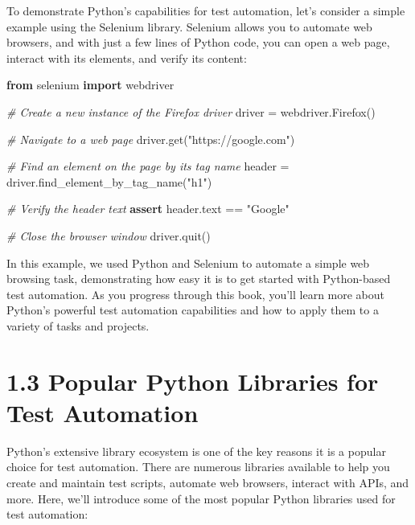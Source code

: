 \documentclass[
  paper=a4,
  ,captions=tableheading
]{scrartcl}
\newenvironment{Shaded}{}{}
\newcommand{\CommentTok}[1]{\textcolor[rgb]{0.38,0.63,0.69}{\textit{#1}}}
\newcommand{\ControlFlowTok}[1]{\textcolor[rgb]{0.00,0.44,0.13}{\textbf{#1}}}
\newcommand{\ImportTok}[1]{\textcolor[rgb]{0.00,0.50,0.00}{\textbf{#1}}}
\newcommand{\NormalTok}[1]{#1}
\newcommand{\OperatorTok}[1]{\textcolor[rgb]{0.40,0.40,0.40}{#1}}
\newcommand{\StringTok}[1]{\textcolor[rgb]{0.25,0.44,0.63}{#1}}
\begin{document}
To demonstrate Python's capabilities for test automation, let's consider
a simple example using the Selenium library. Selenium allows you to
automate web browsers, and with just a few lines of Python code, you can
open a web page, interact with its elements, and verify its content:

\begin{Shaded}
\begin{Highlighting}[]
\ImportTok{from}\NormalTok{ selenium }\ImportTok{import}\NormalTok{ webdriver}

\CommentTok{\# Create a new instance of the Firefox driver}
\NormalTok{driver }\OperatorTok{=}\NormalTok{ webdriver.Firefox()}

\CommentTok{\# Navigate to a web page}
\NormalTok{driver.get(}\StringTok{"https://google.com"}\NormalTok{)}

\CommentTok{\# Find an element on the page by its tag name}
\NormalTok{header }\OperatorTok{=}\NormalTok{ driver.find\_element\_by\_tag\_name(}\StringTok{"h1"}\NormalTok{)}

\CommentTok{\# Verify the header text}
\ControlFlowTok{assert}\NormalTok{ header.text }\OperatorTok{==} \StringTok{"Google"}

\CommentTok{\# Close the browser window}
\NormalTok{driver.quit()}
\end{Highlighting}
\end{Shaded}

In this example, we used Python and Selenium to automate a simple web
browsing task, demonstrating how easy it is to get started with
Python-based test automation. As you progress through this book, you'll
learn more about Python's powerful test automation capabilities and how
to apply them to a variety of tasks and projects.

\hypertarget{popular-python-libraries-for-test-automation}{%
\section{1.3 Popular Python Libraries for Test
Automation}\label{popular-python-libraries-for-test-automation}}

Python's extensive library ecosystem is one of the key reasons it is a
popular choice for test automation. There are numerous libraries
available to help you create and maintain test scripts, automate web
browsers, interact with APIs, and more. Here, we'll introduce some of
the most popular Python libraries used for test automation:
\end{document}
